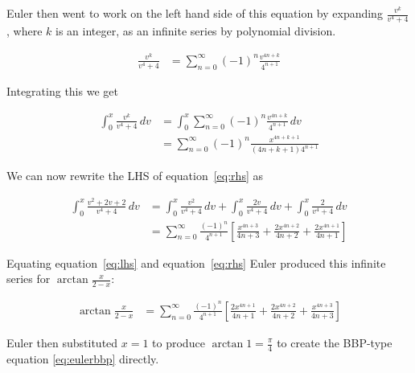 \documentclass[11pt]{article}
\begin{document}



Euler then went to work on the left hand side of this equation by expanding $\frac{v^k}{v^4 + 4}$, where $k$ is an integer, as an infinite series by polynomial division.

\begin{align}
  \frac{v^k}{v^4 + 4}
  &= \sum_{n = 0}^\infty (-1)^n \frac{v^{4n+k}}{4^{n+1}}
\end{align}

Integrating this we get

\begin{align}
  \int_0^x \frac{v^k}{v^4 + 4} \, dv
  &= \int_0^x \sum_{n = 0}^\infty (-1)^n \frac{v^{4n+k}}{4^{n+1}} \, dv \\
  &= \sum_{n = 0}^\infty (-1)^n \frac{x^{4n+k+1}}{(4n+k+1)4^{n+1}}
\end{align}

We can now rewrite the LHS of equation~\eqref{eq:rhs} as

\begin{align}
  \int_0^x \frac{v^2 + 2v + 2}{v^4 + 4} \,dv
  &= \int_0^x \frac{v^2}{v^4 + 4} \,dv
    + \int_0^x \frac{2v}{v^4 + 4} \,dv
    + \int_0^x \frac{2}{v^4 + 4} \,dv \\
  &= \sum_{n = 0}^\infty \frac{(-1)^n}{4^{n+1}} \left[ \label{eq:lhs}
      \frac{x^{4n+3}}{4n+3}
    + \frac{2x^{4n+2}}{4n+2}
    + \frac{2x^{4n+1}}{4n+1}
  \right]
\end{align}

Equating equation~\eqref{eq:lhs} and equation~\eqref{eq:rhs} Euler produced this infinite series for $\arctan{\frac{x}{2-x}}$:

\begin{align} \label{eq:arctanseries}
  \arctan{\frac{x}{2-x}}
  &= \sum_{n = 0}^\infty \frac{(-1)^n}{4^{n+1}} \left[
    \frac{2x^{4n+1}}{4n+1}
    + \frac{2x^{4n+2}}{4n+2}
    + \frac{x^{4n+3}}{4n+3}
  \right]
\end{align}

Euler then substituted $x = 1$ to produce $\arctan{1} = \frac{\pi}{4}$ to create the BBP-type equation \eqref{eq:eulerbbp} directly.
\end{document}
